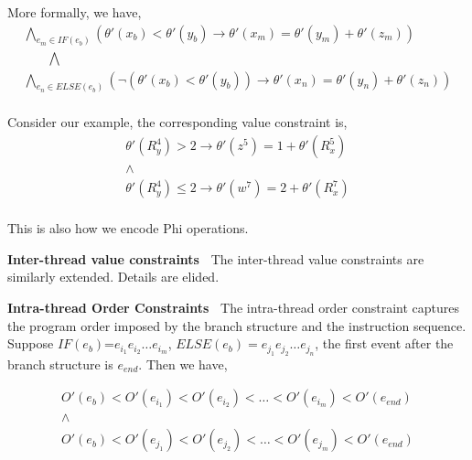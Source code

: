 More formally, we have, 
$$
\begin{array}{l}
\bigwedge\limits_{e_m \in IF(e_b)} (\theta'(x_b) < \theta'(y_b) \rightarrow  \theta'(x_m)=\theta'(y_m)+\theta'(z_m)) \\ 
\quad \quad  \bigwedge  \\
\bigwedge\limits_{e_n \in ELSE(e_b)} (\neg(\theta'(x_b)  < \theta'(y_b)) \rightarrow  \theta'(x_n)=\theta'(y_n)+\theta'(z_n)) \\ 
\end{array}
$$


Consider our example, the corresponding value constraint is, 
$$
\begin{array}{l}
\theta'(R^4_y)>2 \rightarrow \theta'(z^5)=1+\theta'(R^5_x) \\ 
\wedge  \\
\theta'(R^4_y)\leq 2 \rightarrow  \theta'(w^7)=2+\theta'(R^{7}_{x})\\
\end{array}
$$

This is also how we encode Phi operations.


{\bf Inter-thread value constraints\ } The inter-thread value constraints 
are similarly extended. Details are elided.


{\bf Intra-thread Order Constraints\ } The intra-thread order constraint captures the program order imposed by the branch structure and the instruction sequence. Suppose $IF(e_b)$=$e_{i_1}e_{i_2}\dots e_{i_m}$, $ELSE(e_b)=e_{j_1}e_{j_2}\dots e_{j_n}$, the first event after the branch structure is $e_{end}$. Then we have, 

$$
\begin{array}{l}
O'(e_b)<O'(e_{i_1})<O'(e_{i_2})<\dots <O'(e_{i_m})<O'(e_{end})\\
\wedge\\
O'(e_b)<O'(e_{j_1})<O'(e_{j_2})<\dots <O'(e_{j_m})<O'(e_{end})
\end{array}
$$

